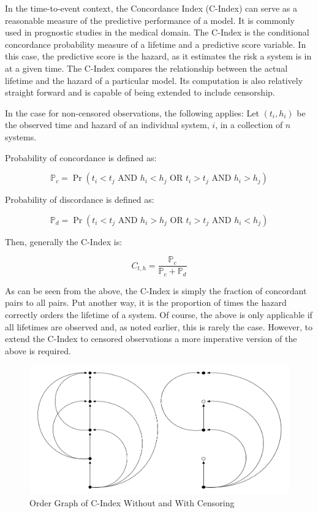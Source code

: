 In the time-to-event context, the Concordance Index (C-Index) can serve as a reasonable measure of the predictive performance of a model. It is commonly used in prognostic studies in the medical domain\cite{Tripepi2010}. The C-Index is the conditional concordance probability measure of a lifetime and a predictive score variable\cite{Kang2015}. In this case, the predictive score is the hazard, as it estimates the risk a system is in at a given time. The C-Index compares the relationship between the actual lifetime and the hazard of a particular model. Its computation is also relatively straight forward and is capable of being extended to include censorship.

In the case for non-censored observations, the following applies: Let $(t_i, h_i)$ be the observed time and hazard of an individual system, $i$, in a collection of $n$ systems.

Probability of concordance is defined as:

$$\mathbb{P}_c  = \Pr(t_i  < t_j \text{ AND } h_i < h_j \text{ OR } t_i  > t_j \text{ AND } h_i > h_j)  $$

Probability of discordance is defined as:

$$\mathbb{P}_d  = \Pr(t_i  < t_j \text{ AND } h_i > h_j \text{ OR } t_i  > t_j \text{ AND } h_i < h_j)  $$

Then, generally the C-Index is:

$$ C_{t, h} = \frac{\mathbb{P}_c}{\mathbb{P}_c + \mathbb{P}_d} $$

As can be seen from the above, the C-Index is simply the fraction of concordant pairs to all pairs. Put another way, it is the proportion of times the hazard correctly orders the lifetime of a system. Of course, the above is only applicable if all lifetimes are observed and, as noted earlier, this is rarely the case. However, to extend the C-Index to censored observations a more imperative version of the above is required. 

\begin{figure}[ht!]
    \centering
    \includegraphics[width=350pt]{img/c_index_graph}
    \caption{Order Graph of C-Index Without and With Censoring}
    \label{ci_graph}
\end{figure}


